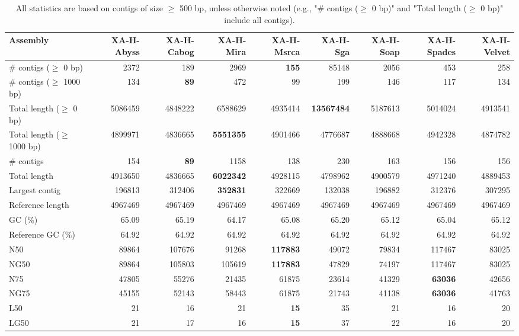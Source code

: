 \documentclass[12pt,a4paper]{article}
\begin{document}
\begin{table}[ht]
\begin{center}
\caption{All statistics are based on contigs of size $\geq$ 500 bp, unless otherwise noted (e.g., "\# contigs ($\geq$ 0 bp)" and "Total length ($\geq$ 0 bp)" include all contigs).}
\begin{tabular}{|l*{8}{|r}|}
\hline
Assembly & XA-H-Abyss & XA-H-Cabog & XA-H-Mira & XA-H-Msrca & XA-H-Sga & XA-H-Soap & XA-H-Spades & XA-H-Velvet \\ \hline
\# contigs ($\geq$ 0 bp) & 2372 & 189 & 2969 & {\bf 155} & 85148 & 2056 & 453 & 258 \\ \hline
\# contigs ($\geq$ 1000 bp) & 134 & {\bf 89} & 472 & 99 & 199 & 146 & 117 & 134 \\ \hline
Total length ($\geq$ 0 bp) & 5086459 & 4848222 & 6588629 & 4935414 & {\bf 13567484} & 5187613 & 5014024 & 4913541 \\ \hline
Total length ($\geq$ 1000 bp) & 4899971 & 4836665 & {\bf 5551355} & 4901466 & 4776687 & 4888668 & 4942328 & 4874782 \\ \hline
\# contigs & 154 & {\bf 89} & 1158 & 138 & 230 & 163 & 156 & 156 \\ \hline
Total length & 4913650 & 4836665 & {\bf 6022342} & 4928115 & 4798962 & 4900579 & 4971240 & 4889453 \\ \hline
Largest contig & 196813 & 312406 & {\bf 352831} & 322669 & 132038 & 196882 & 312376 & 307295 \\ \hline
Reference length & 4967469 & 4967469 & 4967469 & 4967469 & 4967469 & 4967469 & 4967469 & 4967469 \\ \hline
GC (\%) & 65.09 & 65.19 & 64.17 & 65.08 & 65.20 & 65.12 & 65.04 & 65.12 \\ \hline
Reference GC (\%) & 64.92 & 64.92 & 64.92 & 64.92 & 64.92 & 64.92 & 64.92 & 64.92 \\ \hline
N50 & 89864 & 107676 & 91268 & {\bf 117883} & 49072 & 79834 & 117467 & 83025 \\ \hline
NG50 & 89864 & 105803 & 105619 & {\bf 117883} & 47829 & 74197 & 117467 & 83025 \\ \hline
N75 & 47805 & 55276 & 21435 & 61875 & 23614 & 41329 & {\bf 63036} & 42656 \\ \hline
NG75 & 45155 & 52143 & 58443 & 61875 & 21743 & 41138 & {\bf 63036} & 41763 \\ \hline
L50 & 21 & 16 & 21 & {\bf 15} & 35 & 21 & 16 & 20 \\ \hline
LG50 & 21 & 17 & 16 & {\bf 15} & 37 & 22 & 16 & 20 \\ \hline

\end{tabular}
\end{center}
\end{table}
\end{document}
